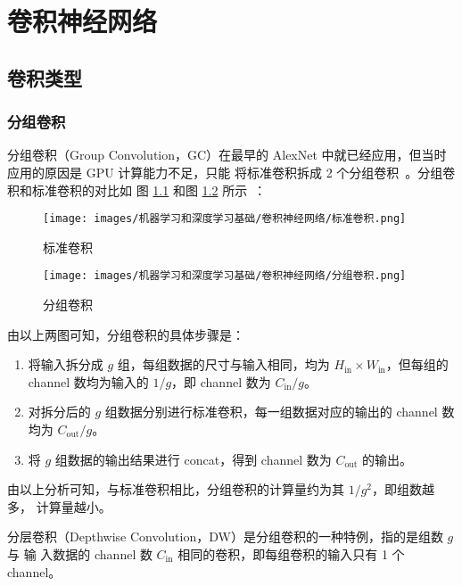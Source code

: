 \chapter{卷积神经网络}

\section{卷积类型}

\subsection{分组卷积}

分组卷积（Group Convolution，GC）在最早的 AlexNet 中就已经应用，但当时应用的原因是 GPU 计算能力不足，只能
将标准卷积拆成 2 个分组卷积~。分组卷积和标准卷积的对比如
图 \ref{fig:normal-conv} 和图 \ref{fig:group-conv} 所示~：

\begin{figure}[ht]
  \centering
  \texttt{[image: images/机器学习和深度学习基础/卷积神经网络/标准卷积.png]}
  \caption{标准卷积}
  \label{fig:normal-conv}
\end{figure}

\begin{figure}[ht]
  \centering
  \texttt{[image: images/机器学习和深度学习基础/卷积神经网络/分组卷积.png]}
  \caption{分组卷积}
  \label{fig:group-conv}
\end{figure}

由以上两图可知，分组卷积的具体步骤是：

\begin{enumerate}
  \item 将输入拆分成 $g$ 组，每组数据的尺寸与输入相同，均为 $H_{\mathrm{in}}
    \times W_{\mathrm{in}}$，但每组的 channel 数均为输入的 $ 1/g $，即 channel
    数为 $ C_{\mathrm{in}} / g $。
  \item 对拆分后的 $g$ 组数据分别进行标准卷积，每一组数据对应的输出的 channel 数
    均为 $ C_{\mathrm{out}}/g $。
  \item 将 $g$ 组数据的输出结果进行 concat，得到 channel 数为 $C_{\mathrm{out}}$
    的输出。
\end{enumerate}

由以上分析可知，与标准卷积相比，分组卷积的计算量约为其 $ 1 / g^2 $，即组数越多，
计算量越小。

分层卷积（Depthwise Convolution，DW）是分组卷积的一种特例，指的是组数 $g$ 与 输
入数据的 channel 数 $C_{\mathrm{in}}$ 相同的卷积，即每组卷积的输入只有 1 个 channel。

